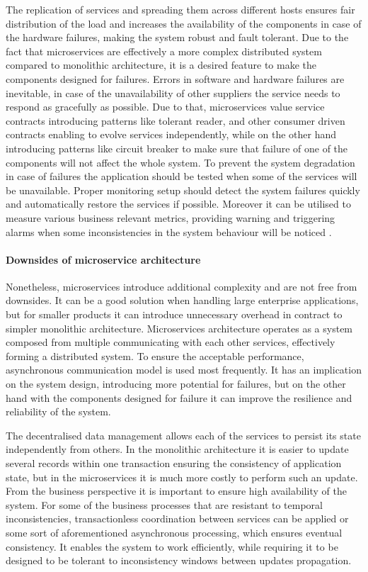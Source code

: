 The replication of services and spreading them across different hosts ensures fair distribution of the load and increases the availability of the components in case of the hardware failures, making the system robust and fault tolerant. Due to the fact that microservices are effectively a more complex distributed system compared to monolithic architecture, it is a desired feature to make the components designed for failures. Errors in software and hardware failures are inevitable, in case of the unavailability of other suppliers the service needs to respond as gracefully as possible. Due to that, microservices value service contracts introducing patterns like tolerant reader, and other consumer driven contracts enabling to evolve services independently, while on the other hand introducing patterns like circuit breaker to make sure that failure of one of the components will not affect the whole system. To prevent the system degradation in case of failures the application should be tested when some of the services will be unavailable. Proper monitoring setup should detect the system failures quickly and automatically restore the services if possible. Moreover it can be utilised to measure various business relevant metrics, providing warning and triggering alarms when some inconsistencies in the system behaviour will be noticed \cite{MicroservicesHowToMakeYourApplicationScale}.

\paragraph{Downsides of microservice architecture}

Nonetheless, microservices introduce additional complexity and are not free from downsides. It can be a good solution when handling large enterprise applications, but for smaller products it can introduce unnecessary overhead in contract to simpler monolithic architecture. Microservices architecture operates as a system composed from multiple communicating with each other services, effectively forming a distributed system. To ensure the acceptable performance, asynchronous communication model is used most frequently. It has an implication on the system design, introducing more potential for failures, but on the other hand with the components designed for failure it can improve the resilience and reliability of the system.

The decentralised data management allows each of the services to persist its state independently from others. In the monolithic architecture it is easier to update several records within one transaction ensuring the consistency of application state, but in the microservices it is much more costly to perform such an update. From the business perspective it is important to ensure high availability of the system. For some of the business processes that are resistant to temporal inconsistencies, transactionless coordination between services can be applied or some sort of aforementioned asynchronous processing, which ensures eventual consistency. It enables the system to work efficiently, while requiring it to be designed to be tolerant to inconsistency windows between updates propagation.

